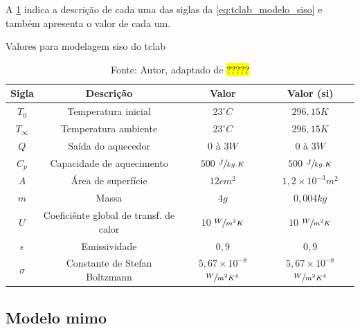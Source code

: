 A \cref{tab:tclab_modelo_siso_valores} indica a descrição de cada uma das siglas da
\cref{eq:tclab_modelo_siso} e também apresenta o valor de cada um.

\begin{table}[h]
	\centering
	\caption{Valores para modelagem \acrshort{siso} do \acrshort{tclab}}
	\label{tab:tclab_modelo_siso_valores}
	\begin{tabular}{cccc} \toprule
		{Sigla} 		& {Descrição} 								& {Valor} 											& {Valor (\acrshort{si})} 							\\ \midrule
		$T_{0}$ 		& Temperatura inicial 						& $23^\circ C$ 										& $296{,}15 K $										\\
		$T_{\infty}$	& Temperatura ambiente						& $23^\circ C$										& $296{,}15 K $										\\
		$Q$				& Saída do aquecedor						& $0$ à $3 W$										& $0$ à $3 W$										\\
		$C_p$			& Capacidade de aquecimento					& $500$ $\sfrac{J}{kg.K}$							& $500$ $\sfrac{J}{kg.K}$							\\
		$A$				& Área de superfície						& $12 cm^{2}$										& $1{,}2{\times}10^{-3} m^{2}$						\\
		$m$				& Massa										& $4 g$												& $0{,}004 kg	$									\\
		$U$				& Coeficiênte global de transf. de calor	& $10$ $\sfrac{W}{m^{2}K}$							& $10$ $\sfrac{W}{m^{2}K}$							\\
		$\epsilon$		& Emissividade								& $0{,}9$											& $0{,}9$											\\
		$\sigma$		& Constante de Stefan Boltzmann				& $5{,}67{\times}10^{-8}$ $\sfrac{W}{m^{2}K^{4}}$	& $5{,}67{\times}10^{-8}$ $\sfrac{W}{m^{2}K^{4}}$	\\ \bottomrule
	\end{tabular}
	\caption*{Fonte: Autor, adaptado de \hl{?????}}		%
\end{table}

\subsection{Modelo \acrshort{mimo}}
\label{subsec:tclab_modelo_mimo}

